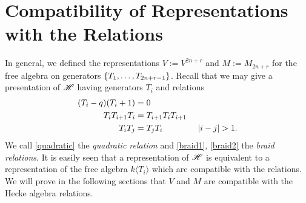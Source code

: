 \documentclass{amsart}
\begin{document}
\iffalse
\begin{proposition}
  Denote the composition factor $M_{2n + r}^r / h^{-1}(K_{2n + r}^r)$ by $U_{2n + r}^r$.
  Then, there exist some naturals $m,s$ satisfying $2m + s = 2n + r$ and $m + s > n + r$ such that the following is an isomorphism of $\SH$-modules \[h^{-1}\prn{K_{2n + r}^r} \simeq U_{2m + s}^s\].
  \qed
\end{proposition}
\begin{proposition}
  For the same $m,s$ as above, we have the following composition series of Specht modules:
  \[
    0 \longrightarrow D^{(m+s,m)} \longrightarrow S^{(n+r,n)} \longrightarrow D^{(n+r,n)} \longrightarrow 0.
  \]
\end{proposition}
\begin{proposition}
  $M_{2n + r}^r \simeq S^{(n+r,n)}$ and $U_{2m +s}^s \simeq D^{(m+s,m)}$.
\end{proposition}
\fi

\newpage
\appendix
\section{Compatibility of Representations with the Relations}\label{Compatibility Section}
In general, we defined the representations $V := V^{2n + r}$ and $M := M_{2n + r}$ for the free algebra on generators $\left\{ T_1,\dots,T_{2n + r - 1} \right\}$.
Recall that we may give a presentation of $\SH$ having generators $T_i$ and relations
\begin{align}
  (T_i - q)(T_i + 1) &= 0 \label{quadratic}\\
  T_iT_{i+1}T_i &= T_{i+1}T_iT_{i+1} \label{braid1}\\ 
  T_iT_j &= T_jT_i \hspace{40pt} \left| i - j \right| > 1. \label{braid2}
\end{align}
We call \eqref{quadratic} the \emph{quadratic relation} and \eqref{braid1}, \eqref{braid2} the \emph{braid relations}.
It is easily seen that a representation of $\SH$ is equivalent to a representation of the free algebra $k\langle T_i \rangle$ which are compatible with the relations.
We will prove in the following sections that $V$ and $M$ are compatible with the Hecke algebra relations.
\end{document}
